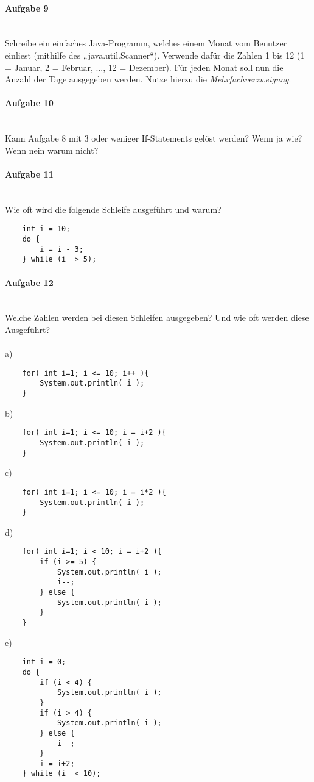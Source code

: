 \documentclass[12pt,a4paper,ngerman]{scrartcl}
\begin{document}
	\paragraph{Aufgabe 9}\mbox{}\\
	Schreibe ein einfaches Java-Programm, welches einem Monat vom Benutzer einliest (mithilfe des „java.util.Scanner“).
	Verwende dafür die Zahlen 1 bis 12 (1 = Januar, 2 = Februar, ..., 12 = Dezember). Für jeden Monat soll nun die Anzahl der Tage ausgegeben werden.
	Nutze hierzu die \emph{Mehrfachverzweigung}.
	
	\paragraph{Aufgabe 10}\mbox{}\\
	Kann Aufgabe 8 mit 3 oder weniger If-Statements gelöst werden? Wenn ja wie? Wenn nein warum nicht?
	
	\paragraph{Aufgabe 11}\mbox{}\\
	Wie oft wird die folgende Schleife ausgeführt und warum?
	\begin{lstlisting}
	int i = 10;
	do { 
		i = i - 3;
	} while (i  > 5);
	\end{lstlisting}
	
	\paragraph{Aufgabe 12}\mbox{}\\
	Welche Zahlen werden bei diesen Schleifen ausgegeben? Und wie oft werden diese Ausgeführt?
	\\\\
	a) \begin{lstlisting}
	for( int i=1; i <= 10; i++ ){
		System.out.println( i );
	} 
	\end{lstlisting}
	b) \begin{lstlisting}
	for( int i=1; i <= 10; i = i+2 ){
		System.out.println( i );
	}  
	\end{lstlisting}
	c) \begin{lstlisting}
	for( int i=1; i <= 10; i = i*2 ){
		System.out.println( i );
	} 
	\end{lstlisting}
	d) \begin{lstlisting}
	for( int i=1; i < 10; i = i+2 ){
		if (i >= 5) {
			System.out.println( i );
			i--;
		} else {
			System.out.println( i );
		} 
	} 
	\end{lstlisting}
	\newpage
	e) \begin{lstlisting}
	int i = 0;
	do { 
		if (i < 4) {
			System.out.println( i );
		}
		if (i > 4) {
			System.out.println( i );
		} else {
			i--;
		} 
		i = i+2;
	} while (i  < 10);  
	\end{lstlisting}
\end{document}
